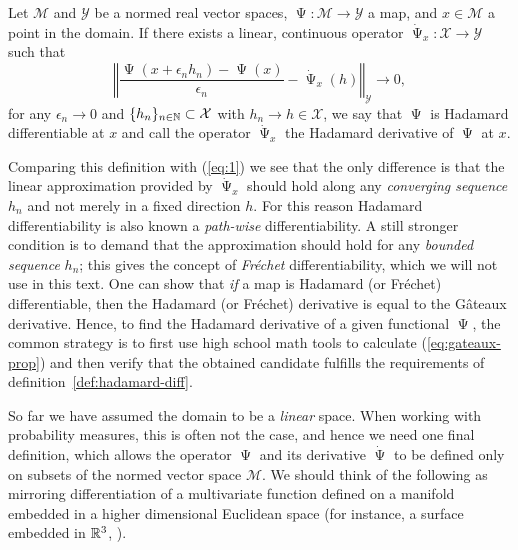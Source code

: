 \documentclass[a4,danish]{article}
\DeclareMathOperator{\TT}{\Psi}
\begin{document}
\begin{definition}
  \label{def:hadamard-diff}
  Let $\mathcal{M}$ and $\mathcal{Y}$ be a normed real vector spaces,
  $\TT \colon \mathcal{M} \rightarrow \mathcal{Y}$ a map, and $x \in \mathcal{M}$ a point in the
  domain. If there exists a linear, continuous operator
  $\dot{\TT}_x \colon \mathcal{X} \rightarrow \mathcal{Y} $ such that
  \begin{equation*}
    \left\Vert
      \frac{\TT(x + \epsilon_n h_n) - \TT(x)}{\epsilon_n} - \dot{\TT}_x(h)
    \right\Vert_{\mathcal{Y}} \longrightarrow 0,
  \end{equation*}
  for any $\epsilon_n \rightarrow 0$ and $\{h_n\}_{n \in \mathbb{N}} \subset \mathcal{X}$ with
  $h_n \rightarrow h \in \mathcal{X}$, we say that $\TT$ is Hadamard differentiable at $x$ and call
  the operator $\dot{\TT}_x$ the Hadamard derivative of $\TT$ at $x$.
\end{definition}

Comparing this definition with (\ref{eq:1}) we see that the only
difference is that the linear approximation provided by $\dot{\TT}_x$
should hold along any \textit{converging sequence} $h_n$ and not
merely in a fixed direction $h$. For this reason Hadamard
differentiability is also known a \textit{path-wise}
differentiability. A still stronger condition is to demand that the
approximation should hold for any \textit{bounded sequence} $h_n$;
this gives the concept of \textit{Fréchet} differentiability, which we 
will not use in this text. One can show that \textit{if} a map is
Hadamard (or Fréchet) differentiable, then the Hadamard (or Fréchet)
derivative is equal to the Gâteaux derivative. Hence, to find the
Hadamard derivative of a given functional $\TT$, the common strategy
is to first use high school math tools to calculate
(\ref{eq:gateaux-prop}) and then verify that the obtained candidate
fulfills the requirements of definition~\ref{def:hadamard-diff}.

So far we have assumed the domain to be a \textit{linear} space. When
working with probability measures, this is often not the case, and
hence we need one final definition, which allows the operator $\TT$
and its derivative $\dot{\TT}$ to be defined only on subsets of the
normed vector space $\mathcal{M}$. We should think of the following as
mirroring differentiation of a multivariate function defined on a
manifold embedded in a higher dimensional Euclidean space (for
instance, a surface embedded in $\mathbb{R}^3$, ).
\end{document}
